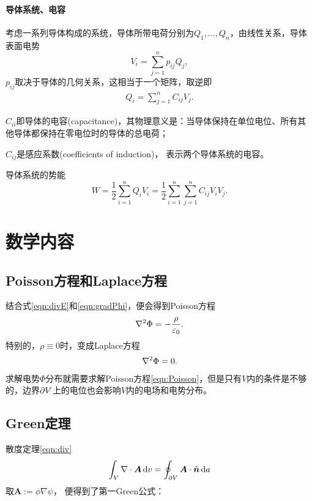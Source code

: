 \paragraph{导体系统、电容}
考虑一系列导体构成的系统，导体所带电荷分别为$Q_1,\ldots,Q_n$，由线性关系，导体表面电势
\[
    V_i=\sum_{j=1}^np_{ij}Q_j,
\]
$p_{ij}$取决于导体的几何关系，这相当于一个矩阵，取逆即
\begin{align}
    Q_i=\sum_{j=1}^nC_{ij}V_j.
\end{align}
\begin{compactitem}
	\item $C_{ii}$即导体的电容(capacitance)，其物理意义是：当导体保持在单位电位、所有其他导体都保持在零电位时的导体的总电荷；
	\item $C_{ij}$是感应系数(coefficients of induction)，%
    表示两个导体系统的电容。
\end{compactitem}
导体系统的势能
\[
    W=\frac12\sum_{i=1}^nQ_iV_i=\frac12\sum_{i=1}^n\sum_{j=1}^nC_{ij}V_iV_j.
\]

\section{数学内容}

\subsection{Poisson方程和Laplace方程}

结合式\eqref{eqn:divE}和\eqref{eqn:gradPhi}，便会得到Poisson方程
\begin{align}
    \label{eqn:Poisson}
    \nabla^2\Phi=-\frac\rho{\varepsilon_0}.
\end{align}
特别的，$\rho\equiv 0$时，变成Laplace方程
\begin{align}
    \label{eqn:Laplace}
    \nabla^2\Phi=0.
\end{align}
求解电势$\Phi$分布就需要求解Poisson方程\eqref{eqn:Poisson}，但是只有$V$内的条件是不够的，边界$\partial V$上的电位也会影响$V$内的电场和电势分布。

\subsection{Green定理}

散度定理\eqref{eqn:div}
\[
    \int_V\nabla\cdot\bm A\mathop{}\!\mathrm{d} v=\oint_{\partial V}\bm A\cdot\mathop{}\!\hat{\bm{n}}\mathop{}\!\mathrm{d} a
\]
取$\bm A:=\phi\nabla\psi$，
便得到了第一Green公式：

